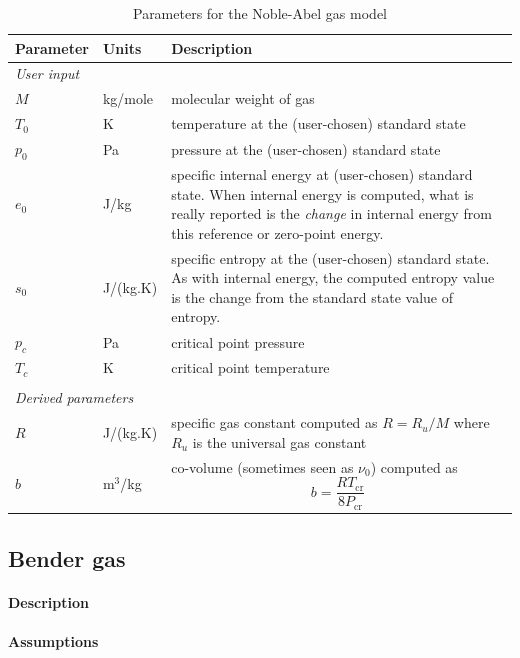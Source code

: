 \begin{table}[h]
\caption{Parameters for the Noble-Abel gas model}
\label{tab:na-params}
\begin{tabular}{llp{10cm}}
\toprule
Parameter & Units & Description \\ \midrule
\multicolumn{3}{l}{\textit{User input}} \\
$M$       & kg/mole & molecular weight of gas \\
$T_0$     & K      & temperature at the (user-chosen) standard state \\
$p_0$     & Pa     & pressure at the (user-chosen) standard state \\
$e_0$     & J/kg   & specific internal energy at (user-chosen) standard state.
                    When internal energy is computed, what is really 
                    reported is the \emph{change} in internal energy
                    from this reference or zero-point energy. \\
$s_0$     & J/(kg.K) & specific entropy at the (user-chosen) standard state.
                       As with internal energy, the computed entropy value
                       is the change from the standard state value of entropy. \\
$p_c$     & Pa     & critical point pressure \\
$T_c$     & K      & critical point temperature \\
 & & \\
\multicolumn{3}{l}{\textit{Derived parameters}} \\
$R$      & J/(kg.K) & specific gas constant computed as $R = R_u/M$ where
                      $R_u$ is the universal gas constant \\
$b$      & m$^3$/kg & co-volume (sometimes seen as $\nu_0$) computed as
                      \[ b = \frac{R T_{\text{cr}}}{8 P_{\text{cr}}} \] \\

\bottomrule
\end{tabular}
\end{table}

\subsection{Bender gas}
\label{sec:bender_gas}

\paragraph{Description}
\paragraph{Assumptions}
